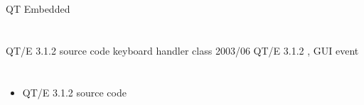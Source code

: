    \documentclass[a4paper,12pt]{book}
\begin{document}
\begin{titlepage}
\Huge QT Embedded {\MgQ{}}
%
\end{titlepage}

\tableofcontents
\normalsize

\chapter{{\MaQ{}}}
{\MaQ{}} QT/E 3.1.2 {\MbQ{}} source code{\MaQ{}}\zZ
{\MaQ{}} keyboard handler class{\MaQ{}}\zZ
{\MbQ{}} 2003/06 {\McQ{}} QT/E 3.1.2 {\MbQ{}},
{\MbQ{}} GUI event {\MbQ{}}\zZ

\fboxsep=1pt







\chapter{{\MaQ{}}}
\begin{itemize}
\item QT/E 3.1.2 source code{\MaQ{}}\zZ
\end{itemize}
\end{document}
